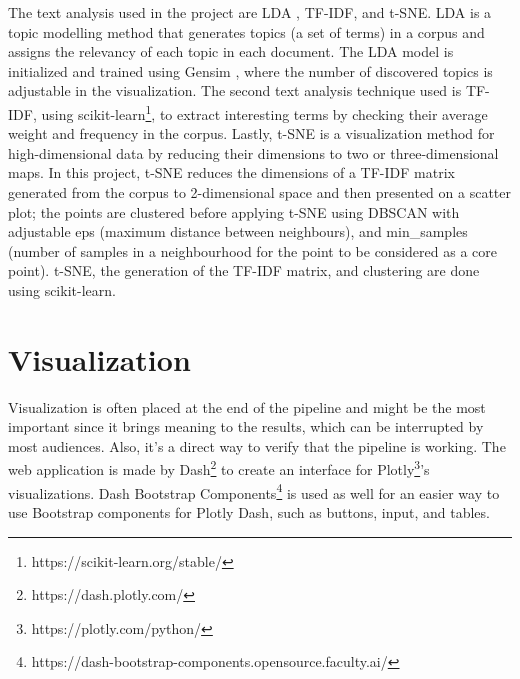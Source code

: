 The text analysis used in the project are \ac{LDA} \cite{pritchardInferencePopulationStructure2000}
\cite{falushInferencePopulationStructure2003}, \ac{TF-IDF}, and
\ac{t-SNE}\cite{vandermaatenVisualizingHighDimensionalData2008}. \ac{LDA} is a topic modelling
method that generates topics (a set of terms) in a corpus and assigns the relevancy of each topic in
each document. The \ac{LDA} model is initialized and trained using Gensim \cite{rehurek_lrec},
where the number of discovered topics is adjustable in the visualization. The second text analysis
technique used is \ac{TF-IDF}, using scikit-learn\footnote{https://scikit-learn.org/stable/}, to
extract interesting terms by checking their average weight and frequency in the corpus. Lastly,
\ac{t-SNE} is a visualization method for high-dimensional data by reducing their dimensions to two
or three-dimensional maps. In this project, \ac{t-SNE} reduces the dimensions of a \ac{TF-IDF}
matrix generated from the corpus to 2-dimensional space and then presented on a scatter plot; the
points are clustered before applying \ac{t-SNE} using \ac{DBSCAN} with adjustable eps (maximum
distance between neighbours), and min\_samples (number of samples in a neighbourhood for the
point to be considered as a core point). \ac{t-SNE}, the generation of the \ac{TF-IDF} matrix, and
clustering are done using scikit-learn.

\section{Visualization}

  Visualization is often placed at the end of the pipeline and might be the most important since it
  brings meaning to the results, which can be interrupted by most audiences. Also, it's a direct way
  to verify that the pipeline is working. The web application is made by
  Dash\footnote{https://dash.plotly.com/} to create an interface for
  Plotly\footnote{https://plotly.com/python/}'s visualizations. Dash Bootstrap
  Components\footnote{https://dash-bootstrap-components.opensource.faculty.ai/} is used as well for
  an easier way to use Bootstrap components for Plotly Dash, such as buttons, input, and tables.

